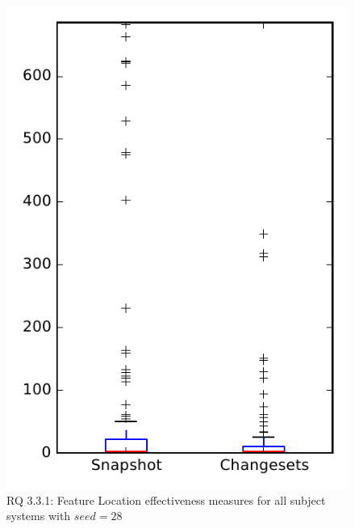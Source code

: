 
\begin{figure}
\centering
\includegraphics[height=0.4\textheight]{figures/flt_seed/rq1_overview_28}
\caption{RQ 3.3.1: Feature Location effectiveness measures for all subject systems with $seed=28$}
\label{fig:flt_seed:rq1:overview}
\end{figure}
